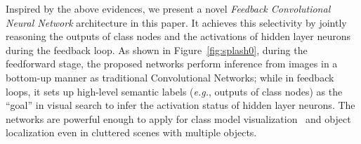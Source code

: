 Inspired by the above evidences, we present a novel \emph{Feedback Convolutional Neural Network} architecture in this paper. It achieves this selectivity by jointly reasoning the outputs of class nodes and the activations of hidden layer neurons during the feedback loop. As shown in Figure~\ref{fig:splash0}, during the feedforward stage, the proposed networks perform inference from images in a bottom-up manner as traditional Convolutional Networks; while in feedback loops, it sets up high-level semantic labels (\emph{e.g.}, outputs of class nodes) as the ``goal'' in visual search to infer the activation status of hidden layer neurons. The networks are powerful enough to apply for class model visualization~\cite{simonyan2013deep, zeiler2014visualizing} and object localization even in cluttered scenes with multiple objects.

